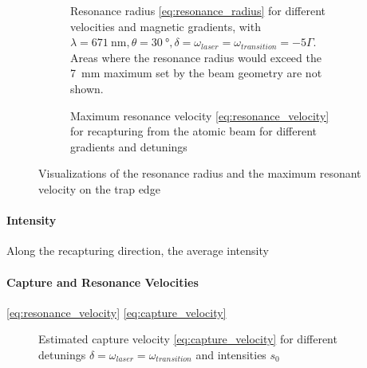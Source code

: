 \begin{figure}
    \centering
    \begin{subfigure}[t]{0.48\textwidth}
        \caption{Resonance radius \eqref{eq:resonance_radius} for different velocities and magnetic gradients, with $\lambda = \SI{671}{\nano\meter}, \theta = \SI[]{30}{\degree}, \delta = \omega_{laser} = \omega_{transition} = -5\Gamma$. Areas where the resonance radius would exceed the \SI[]{7}{\milli\meter} maximum set by the beam geometry are not shown.
        }
        \label{fig:resonance_radius}
    \end{subfigure}
    \hspace{0.03\textwidth}
    \begin{subfigure}[t]{0.48\textwidth}
        \caption{Maximum resonance velocity \eqref{eq:resonance_velocity} for recapturing from the atomic beam for different gradients and detunings
        }
        \label{fig:resonance_velocity}
    \end{subfigure}
    \caption{Visualizations of the resonance radius and the maximum resonant velocity on the trap edge}
    \label{fig:resonance_conditions}
\end{figure}



\paragraph{Intensity}
Along the recapturing direction, the average intensity 

\paragraph{Capture and Resonance Velocities}

\eqref{eq:resonance_velocity} \eqref{eq:capture_velocity}

\begin{figure}
    \centering
    \caption{Estimated capture velocity \eqref{eq:capture_velocity} for different detunings $\delta = \omega_{laser} = \omega_{transition}$ and intensities $s_0$
    }
    \label{fig:capture_velocity}
\end{figure}


